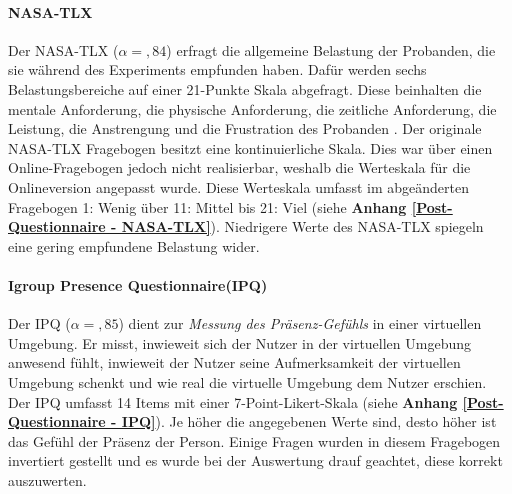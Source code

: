 \documentclass[a4paper,11pt]{article}%
\renewcommand{\\}{\vspace*{0.5\baselineskip} \newline}
\begin{document}
		\paragraph{NASA-TLX}
Der NASA-TLX ($\alpha =,84$) erfragt die allgemeine Belastung der Probanden, die sie während des Experiments empfunden haben. Dafür werden sechs Belastungsbereiche auf einer 21-Punkte Skala abgefragt. Diese beinhalten die mentale Anforderung, die physische Anforderung, die zeitliche Anforderung, die Leistung, die Anstrengung und die Frustration des Probanden \citep{NASATLX}.
Der originale NASA-TLX Fragebogen besitzt eine kontinuierliche Skala. Dies war über einen Online-Fragebogen jedoch nicht realisierbar, weshalb die Werteskala für die Onlineversion angepasst wurde. Diese Werteskala umfasst im abgeänderten Fragebogen 1: \glqq{}Wenig\dq{} über 11: \glqq{}Mittel\dq{} bis 21: \glqq{}Viel\dq{} (siehe \textbf{Anhang \ref{Post-Questionnaire - NASA-TLX}}). Niedrigere Werte des NASA-TLX spiegeln eine gering empfundene Belastung wider.

		\paragraph{Igroup Presence Questionnaire(IPQ)}
Der IPQ ($\alpha =,85$) dient zur \textit{Messung des Präsenz-Gefühls} in einer virtuellen Umgebung. Er misst, inwieweit sich der Nutzer in der virtuellen Umgebung anwesend fühlt, inwieweit der Nutzer seine Aufmerksamkeit der virtuellen Umgebung schenkt und wie real die virtuelle Umgebung dem Nutzer erschien. Der IPQ umfasst 14 Items mit einer 7-Point-Likert-Skala (siehe \textbf{Anhang \ref{Post-Questionnaire - IPQ}}). Je höher die angegebenen Werte sind, desto höher ist das Gefühl der Präsenz der Person. Einige Fragen wurden in diesem Fragebogen invertiert gestellt und es wurde bei der Auswertung drauf geachtet, diese korrekt auszuwerten.
		
\end{document}
